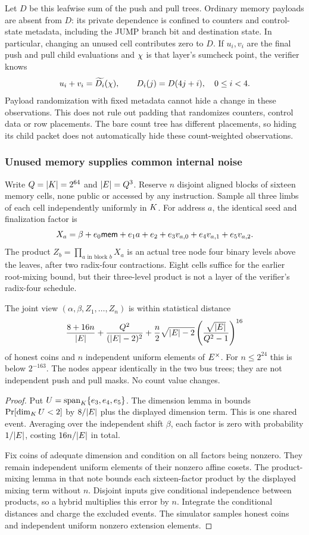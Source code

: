 Let $D$ be this leafwise sum of the push and pull trees. Ordinary memory payloads are absent from $D$: its private dependence is confined to counters and control-state metadata, including the JUMP branch bit and destination state. In particular, changing an unused cell contributes zero to $D$. If $u_i,v_i$ are the final push and pull child evaluations and $\chi$ is that layer's sumcheck point, the verifier knows
\[
 u_i+v_i=\widetilde{D_i}(\chi),\qquad D_i(j)=D(4j+i),\quad 0\le i<4.
\]
Payload randomization with fixed metadata cannot hide a change in these observations. This does not rule out padding that randomizes counters, control data or row placements. The bare count tree has different placements, so hiding its child packet does not automatically hide these count-weighted observations.

\subsubsection{Unused memory supplies common internal noise}

Write $Q=|K|=2^{64}$ and $|E|=Q^3$. Reserve $n$ disjoint aligned blocks of sixteen memory cells, none public or accessed by any instruction. Sample all three limbs of each cell independently uniformly in $K$. For address $a$, the identical seed and finalization factor is
\[
 X_a=\beta+e_0\mathsf{mem}+e_1a+e_2+e_3v_{a,0}+e_4v_{a,1}+e_5v_{a,2}.
\]
The product $Z_b=\prod_{a\text{ in block }b}X_a$ is an actual tree node four binary levels above the leaves, after two radix-four contractions. Eight cells suffice for the earlier root-mixing bound, but their three-level product is not a layer of the verifier's radix-four schedule.

\begin{proposition}
The joint view $(\alpha,\beta,Z_1,\ldots,Z_n)$ is within statistical distance
\[
 \frac{8+16n}{|E|}+\frac{Q^2}{(|E|-2)^2}
 +\frac n2\sqrt{|E|-2}
       \left(\frac{\sqrt{|E|}}{Q^2-1}\right)^{16}
\]
of honest coins and $n$ independent uniform elements of $E^\times$. For $n\le2^{24}$ this is below $2^{-163}$. The nodes appear identically in the two bus trees; they are not independent push and pull masks. No count value changes.
\end{proposition}
\begin{proof}
Put $U=\operatorname{span}_{K}\{e_3,e_4,e_5\}$. The dimension lemma in  bounds $\Pr[\dim_{K}U<2]$ by $8/|E|$ plus the displayed dimension term. This is one shared event. Averaging over the independent shift $\beta$, each factor is zero with probability $1/|E|$, costing $16n/|E|$ in total.

Fix coins of adequate dimension and condition on all factors being nonzero. They remain independent uniform elements of their nonzero affine cosets. The product-mixing lemma in that note bounds each sixteen-factor product by the displayed mixing term without $n$. Disjoint inputs give conditional independence between products, so a hybrid multiplies this error by $n$. Integrate the conditional distances and charge the excluded events. The simulator samples honest coins and independent uniform nonzero extension elements.
\end{proof}

